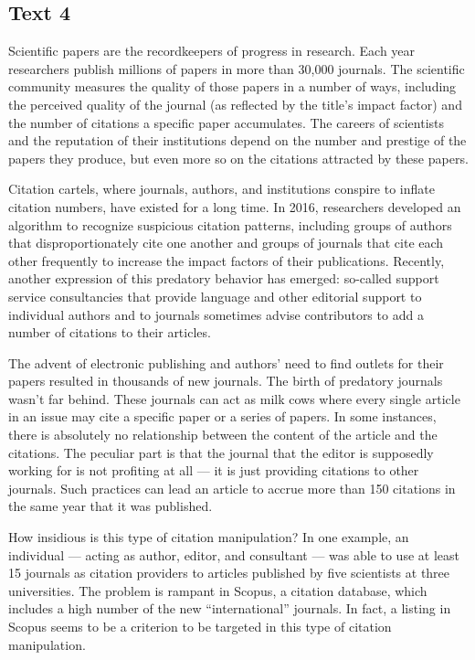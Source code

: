 \newpage
\subsection{Text 4}

Scientific papers are the recordkeepers of progress in research. Each year researchers publish millions of papers in more than 30,000 journals. The scientific community measures the quality of those papers in a number of ways, including the perceived quality of the journal (as reflected by the title's impact factor) and the number of citations a specific paper accumulates. The careers of scientists and the reputation of their institutions depend on the number and prestige of the papers they produce, but even more so on the citations attracted by these papers.

Citation cartels, where journals, authors, and institutions conspire to inflate citation numbers, have existed for a long time. In 2016, researchers developed an algorithm to recognize suspicious citation patterns, including groups of authors that disproportionately cite one another and groups of journals that cite each other frequently to increase the impact factors of their publications. Recently, another expression of this predatory behavior has emerged: so-called support service consultancies that provide language and other editorial support to individual authors and to journals sometimes advise contributors to add a number of citations to their articles.

The advent of electronic publishing and authors' need to find outlets for their papers resulted in thousands of new journals. The birth of predatory journals wasn't far behind. These journals can act as milk cows where every single article in an issue may cite a specific paper or a series of papers. In some instances, there is absolutely no relationship between the content of the article and the citations. The peculiar part is that the journal that the editor is supposedly working for is not profiting at all — it is just providing citations to other journals. Such practices can lead an article to accrue more than 150 citations in the same year that it was published.

How insidious is this type of citation manipulation? In one example, an individual — acting as author, editor, and consultant — was able to use at least 15 journals as citation providers to articles published by five scientists at three universities. The problem is rampant in Scopus, a citation database, which includes a high number of the new ``international'' journals. In fact, a listing in Scopus seems to be a criterion to be targeted in this type of citation manipulation.

